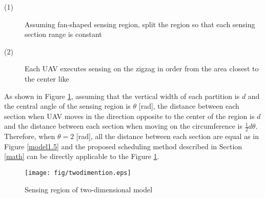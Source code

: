 \documentclass[journal]{IEEEtran}
\begin{document}
\begin{description}
\item[(1)]  Assuming fan-shaped sensing region, split the region so that each sensing section range is constant
\item[(2)] Each UAV executes sensing on the zigzag in order from the area closest to the center like \cite{Maza2007}
\end{description}

As shown in Figure \ref{twodimention}, assuming that the vertical width of each partition is $d$ and the central angle of the sensing region is $\theta$ [rad], the distance between each section when UAV moves in the direction opposite to the center of the region is $d$ and the distance between each section when moving on the circumference is $\frac{1}{2}d\theta$.
Therefore, when $\theta=2$ [rad], all the distance between each section are equal as in Figure \ref{model1.5} and the proposed scheduling method described in Section \ref{math} can be directly applicable to the Figure \ref{twodimention}.
\begin{figure}[t]
\begin{center}
\texttt{[image: fig/twodimention.eps]}
\caption{Sensing region of two-dimensional model}
\label{twodimention}
\end{center}
\end{figure}
\end{document}
